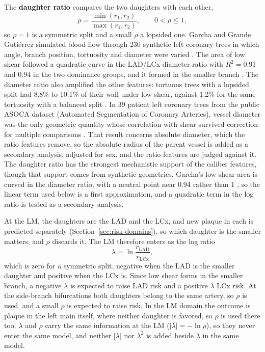 The \textbf{daughter ratio} compares the two daughters with each other,
\begin{equation}
  \rho = \frac{\min(r_1, r_2)}{\max(r_1, r_2)}, \qquad 0 < \rho \leq 1,
  \label{eq:risk-daughter}
\end{equation}
so $\rho = 1$ is a symmetric split and a small $\rho$ a lopsided one.
Garcha and Grande Guti\'errez simulated blood flow through 230 synthetic left coronary trees in which angle, branch position, tortuosity and diameter were varied \cite{garcha2025sensitivity}.
The area of low shear followed a quadratic curve in the LAD/LCx diameter ratio with $R^2 = 0.91$ and $0.94$ in the two dominance groups, and it formed in the smaller branch \cite{garcha2025sensitivity}.
The diameter ratio also amplified the other features: tortuous trees with a lopsided split had 8.8\% to 10.1\% of their wall under low shear, against 1.2\% for the same tortuosity with a balanced split \cite{garcha2025sensitivity}.
In 39 patient left coronary trees from the public ASOCA dataset (Automated Segmentation of Coronary Arteries), vessel diameter was the only geometric quantity whose correlation with shear survived correction for multiple comparisons \cite{shen2025helical}.
That result concerns absolute diameter, which the ratio features remove, so the absolute radius of the parent vessel is added as a secondary analysis, adjusted for sex, and the ratio features are judged against it.
The daughter ratio has the strongest mechanistic support of the caliber features, though that support comes from synthetic geometries.
Garcha's low-shear area is curved in the diameter ratio, with a neutral point near 0.94 rather than 1 \cite{garcha2025sensitivity}, so the linear term used below is a first approximation, and a quadratic term in the log ratio is tested as a secondary analysis.

At the LM, the daughters are the LAD and the LCx, and new plaque in each is predicted separately (Section~\ref{sec:risk-domains}), so which daughter is the smaller matters, and $\rho$ discards it.
The LM therefore enters as the log ratio
\begin{equation}
  \lambda = \ln\frac{r_{\mathrm{LAD}}}{r_{\mathrm{LCx}}},
  \label{eq:risk-lambda}
\end{equation}
which is zero for a symmetric split, negative when the LAD is the smaller daughter and positive when the LCx is.
Since low shear forms in the smaller branch, a negative $\lambda$ is expected to raise LAD risk and a positive $\lambda$ LCx risk.
At the side-branch bifurcations both daughters belong to the same artery, so $\rho$ is used, and a small $\rho$ is expected to raise risk.
In the LM domain the outcome is plaque in the left main itself, where neither daughter is favored, so $\rho$ is used there too.
$\lambda$ and $\rho$ carry the same information at the LM ($\lvert\lambda\rvert = -\ln\rho$), so they never enter the same model, and neither $\lvert\lambda\rvert$ nor $\lambda^2$ is added beside $\lambda$ in the same model.


